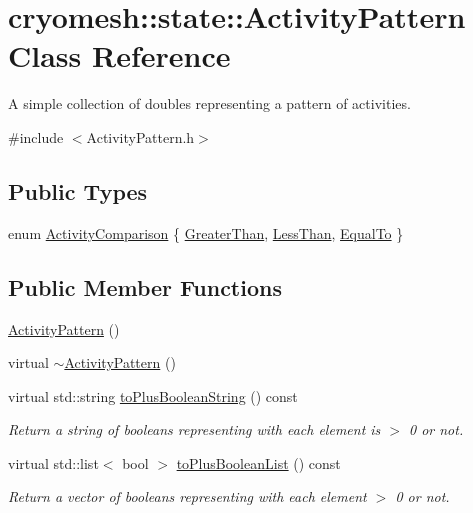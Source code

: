\hypertarget{classcryomesh_1_1state_1_1ActivityPattern}{\section{cryomesh\-:\-:state\-:\-:\-Activity\-Pattern \-Class \-Reference}
\label{classcryomesh_1_1state_1_1ActivityPattern}
}


\-A simple collection of doubles representing a pattern of activities.  




{\ttfamily \#include $<$\-Activity\-Pattern.\-h$>$}

\subsection*{\-Public \-Types}
\begin{DoxyCompactItemize}
\item 
enum \hyperlink{classcryomesh_1_1state_1_1ActivityPattern_a6bd9cf293aeb147f73bb82c67c626142}{\-Activity\-Comparison} \{ \hyperlink{classcryomesh_1_1state_1_1ActivityPattern_a6bd9cf293aeb147f73bb82c67c626142a662e9a99585fd1bc07baeb0c41d918fb}{\-Greater\-Than}, 
\hyperlink{classcryomesh_1_1state_1_1ActivityPattern_a6bd9cf293aeb147f73bb82c67c626142acbf08b9dc89f783f6a30b7fdfb1cf566}{\-Less\-Than}, 
\hyperlink{classcryomesh_1_1state_1_1ActivityPattern_a6bd9cf293aeb147f73bb82c67c626142ab45ac9f1c25aba4e864672959f0467e9}{\-Equal\-To}
 \}
\end{DoxyCompactItemize}
\subsection*{\-Public \-Member \-Functions}
\begin{DoxyCompactItemize}
\item 
\hyperlink{classcryomesh_1_1state_1_1ActivityPattern_a78d90e329f3fc620c06999ab1f6e8613}{\-Activity\-Pattern} ()
\item 
virtual \hyperlink{classcryomesh_1_1state_1_1ActivityPattern_af15e1c186e21be79db47ea07c9e8175f}{$\sim$\-Activity\-Pattern} ()
\item 
virtual std\-::string \hyperlink{classcryomesh_1_1state_1_1ActivityPattern_a5b57eec82f5de97fc01ed356c13903f5}{to\-Plus\-Boolean\-String} () const 
\begin{DoxyCompactList}\small\item\em \-Return a string of booleans representing with each element is $>$ 0 or not. \end{DoxyCompactList}\item 
virtual std\-::list$<$ bool $>$ \hyperlink{classcryomesh_1_1state_1_1ActivityPattern_a3482fe5e7dbaed86272dd536adc7d751}{to\-Plus\-Boolean\-List} () const 
\begin{DoxyCompactList}\small\item\em \-Return a vector of booleans representing with each element $>$ 0 or not. \end{DoxyCompactList}\end{DoxyCompactItemize}
